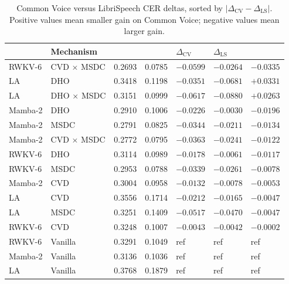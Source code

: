 \begin{table}[!htbp]
\centering
\small
\caption[Common Voice CER comparison]{Common Voice versus
LibriSpeech CER deltas, sorted by
$|\Delta_{\mathrm{CV}} - \Delta_{\mathrm{LS}}|$. Positive values
mean smaller gain on Common Voice; negative values mean larger
gain.}
\label{tab:results:cv-cross}
\setlength{\tabcolsep}{2pt}
\renewcommand{\arraystretch}{1.15}
\begin{tabularx}{\linewidth}{@{}L{1.89cm} L{3.02cm} N{1.44cm} N{1.44cm} N{1.74cm} N{1.74cm} N{2.06cm}@{}}
\toprule
\textbf{} & \textbf{Mechanism} &
\textbf{} & \textbf{} &
\textbf{$\Delta_{\mathrm{CV}}$} & \textbf{$\Delta_{\mathrm{LS}}$} &
\textbf{} \\
\midrule
RWKV-6  & CVD $\times$ MSDC & 0.2693 & 0.0785 & $-0.0599$ & $-0.0264$ & $-0.0335$ \\
LA      & DHO               & 0.3418 & 0.1198 & $-0.0351$ & $-0.0681$ & $+0.0331$ \\
LA      & DHO $\times$ MSDC & 0.3151 & 0.0999 & $-0.0617$ & $-0.0880$ & $+0.0263$ \\
Mamba-2 & DHO               & 0.2910 & 0.1006 & $-0.0226$ & $-0.0030$ & $-0.0196$ \\
Mamba-2 & MSDC              & 0.2791 & 0.0825 & $-0.0344$ & $-0.0211$ & $-0.0134$ \\
Mamba-2 & CVD $\times$ MSDC & 0.2772 & 0.0795 & $-0.0363$ & $-0.0241$ & $-0.0122$ \\
RWKV-6  & DHO               & 0.3114 & 0.0989 & $-0.0178$ & $-0.0061$ & $-0.0117$ \\
RWKV-6  & MSDC              & 0.2953 & 0.0788 & $-0.0339$ & $-0.0261$ & $-0.0078$ \\
Mamba-2 & CVD               & 0.3004 & 0.0958 & $-0.0132$ & $-0.0078$ & $-0.0053$ \\
LA      & CVD               & 0.3556 & 0.1714 & $-0.0212$ & $-0.0165$ & $-0.0047$ \\
LA      & MSDC              & 0.3251 & 0.1409 & $-0.0517$ & $-0.0470$ & $-0.0047$ \\
RWKV-6  & CVD               & 0.3248 & 0.1007 & $-0.0043$ & $-0.0042$ & $-0.0002$ \\
RWKV-6  & Vanilla           & 0.3291 & 0.1049 & ref       & ref       & ref \\
Mamba-2 & Vanilla           & 0.3136 & 0.1036 & ref       & ref       & ref \\
LA      & Vanilla           & 0.3768 & 0.1879 & ref       & ref       & ref \\
\bottomrule
\end{tabularx}
\end{table}

